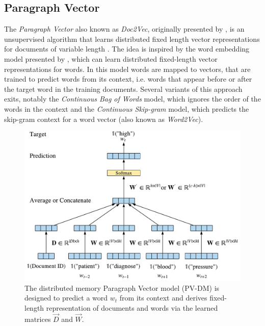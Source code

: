 \subsection{Paragraph Vector}

The \textit{Paragraph Vector} also known as \textit{Doc2Vec}, originally presented by \citeauthor{DBLP:conf/icml/LeM14}, is an unsupervised algorithm that learns distributed fixed length vector representations for documents of variable length \cite{DBLP:conf/icml/LeM14}.
The idea is inspired by the word embedding model presented by \citeauthor{DBLP:journals/jmlr/BengioDVJ03} \cite{DBLP:journals/jmlr/BengioDVJ03}, which can learn distributed fixed-length vector representations for words.
In this model words are mapped to vectors, that are trained to predict words from its context, i.e. words that appear before or after the target word in the training documents.
Several variants of this approach exits, notably the \textit{Continuous Bag of Words} model, which ignores the order of the words in the context and the \textit{Continuous Skip-gram} model, which predicts the skip-gram context for a word vector (also known as \textit{Word2Vec})\cite{DBLP:journals/corr/abs-1301-3781}.

\begin{figure}[!htbp]
	\centering
	\includegraphics[width=\textwidth]{figures/paragraph-vector}
	\caption{The distributed memory Paragraph Vector model (PV-DM) is designed to predict a word $w_t$ from its context and derives fixed-length representation of documents and words via the learned matrices $\vec{D}$ and $\vec{W}$.}
	\label{fig:paragraph-vector}
\end{figure}

